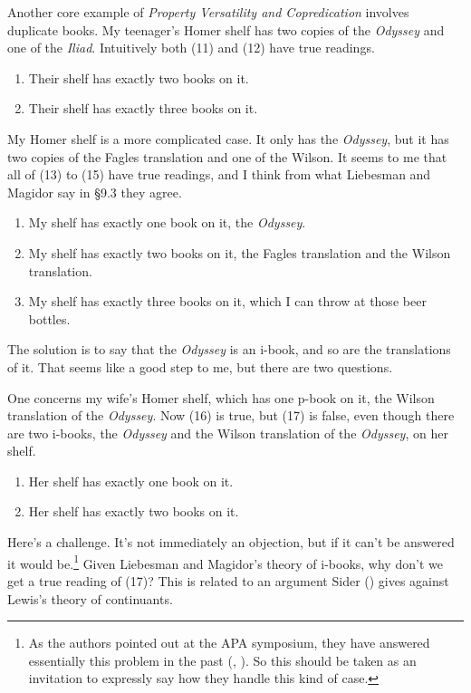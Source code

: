 \documentclass[
  11pt,
  letterpaper,
  DIV=11,
  numbers=noendperiod,
  twoside]{scrartcl}
\providecommand{\tightlist}{%
  \setlength{\itemsep}{0pt}\setlength{\parskip}{0pt}}
\begin{document}
Another core example of \emph{Property Versatility and Copredication}
involves duplicate books. My teenager's Homer shelf has two copies of
the \emph{Odyssey} and one of the \emph{Iliad}. Intuitively both (11)
and (12) have true readings.

\begin{enumerate}
\def\labelenumi{(\arabic{enumi})}
\setcounter{enumi}{10}
\tightlist
\item
  Their shelf has exactly two books on it.
\item
  Their shelf has exactly three books on it.
\end{enumerate}

My Homer shelf is a more complicated case. It only has the
\emph{Odyssey}, but it has two copies of the Fagles translation and one
of the Wilson. It seems to me that all of (13) to (15) have true
readings, and I think from what Liebesman and Magidor say in §9.3 they
agree.

\begin{enumerate}
\def\labelenumi{(\arabic{enumi})}
\setcounter{enumi}{12}
\tightlist
\item
  My shelf has exactly one book on it, the \emph{Odyssey}.
\item
  My shelf has exactly two books on it, the Fagles translation and the
  Wilson translation.
\item
  My shelf has exactly three books on it, which I can throw at those
  beer bottles.
\end{enumerate}

The solution is to say that the \emph{Odyssey} is an i-book, and so are
the translations of it. That seems like a good step to me, but there are
two questions.

One concerns my wife's Homer shelf, which has one p-book on it, the
Wilson translation of the \emph{Odyssey}. Now (16) is true, but (17) is
false, even though there are two i-books, the \emph{Odyssey} and the
Wilson translation of the \emph{Odyssey}, on her shelf.

\begin{enumerate}
\def\labelenumi{(\arabic{enumi})}
\setcounter{enumi}{15}
\tightlist
\item
  Her shelf has exactly one book on it.
\item
  Her shelf has exactly two books on it.
\end{enumerate}

Here's a challenge. It's not immediately an objection, but if it can't
be answered it would be.\footnote{As the authors pointed out at the APA
  symposium, they have answered essentially this problem in the past
  (,
  ). So this should be taken as an
  invitation to expressly say how they handle this kind of case.} Given
Liebesman and Magidor's theory of i-books, why don't we get a true
reading of (17)? This is related to an argument Sider
() gives against Lewis's theory of
continuants.
\end{document}
